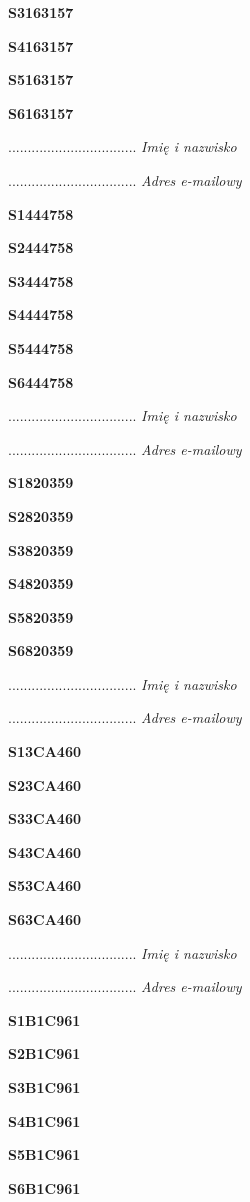 \Large \textbf{S3163157}

\Large \textbf{S4163157}

\Large \textbf{S5163157}

\Large \textbf{S6163157}

.................................
\textit{Imię i nazwisko}

.................................
\textit{Adres e-mailowy}

\Large \textbf{S1444758}

\Large \textbf{S2444758}

\Large \textbf{S3444758}

\Large \textbf{S4444758}

\Large \textbf{S5444758}

\Large \textbf{S6444758}

.................................
\textit{Imię i nazwisko}

.................................
\textit{Adres e-mailowy}

\Large \textbf{S1820359}

\Large \textbf{S2820359}

\Large \textbf{S3820359}

\Large \textbf{S4820359}

\Large \textbf{S5820359}

\Large \textbf{S6820359}

.................................
\textit{Imię i nazwisko}

.................................
\textit{Adres e-mailowy}

\Large \textbf{S13CA460}

\Large \textbf{S23CA460}

\Large \textbf{S33CA460}

\Large \textbf{S43CA460}

\Large \textbf{S53CA460}

\Large \textbf{S63CA460}

.................................
\textit{Imię i nazwisko}

.................................
\textit{Adres e-mailowy}

\Large \textbf{S1B1C961}

\Large \textbf{S2B1C961}

\Large \textbf{S3B1C961}

\Large \textbf{S4B1C961}

\Large \textbf{S5B1C961}

\Large \textbf{S6B1C961}

